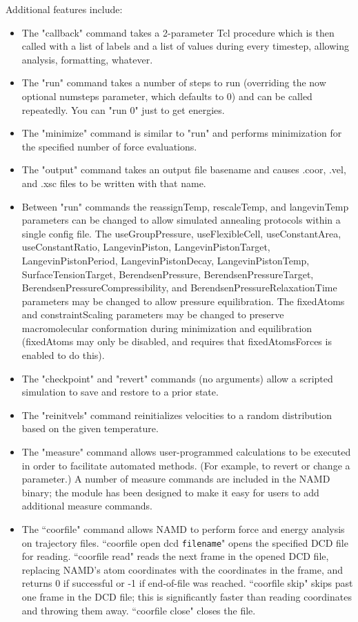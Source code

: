 Additional features include:
\begin{itemize}
 \item The "callback" command takes a 2-parameter Tcl procedure which
    is then called with a list of labels and a list of values during
    every timestep, allowing analysis, formatting, whatever.
 \item The "run" command takes a number of steps to run (overriding the
    now optional numsteps parameter, which defaults to 0) and can be
    called repeatedly.  You can "run 0" just to get energies.
 \item The "minimize" command is similar to "run" and performs
    minimization for the specified number of force evaluations.
 \item The "output" command takes an output file basename and causes
    .coor, .vel, and .xsc files to be written with that name.
 \item Between "run" commands the reassignTemp, rescaleTemp, and
    langevinTemp parameters can be changed to allow simulated
    annealing protocols within a single config file.
    The useGroupPressure, useFlexibleCell, useConstantArea, useConstantRatio,
    LangevinPiston, LangevinPistonTarget, LangevinPistonPeriod,
    LangevinPistonDecay, LangevinPistonTemp, SurfaceTensionTarget,
    BerendsenPressure, BerendsenPressureTarget,
    BerendsenPressureCompressibility, and BerendsenPressureRelaxationTime
    parameters may be changed to allow pressure equilibration.
    The fixedAtoms and constraintScaling parameters may be changed to
    preserve macromolecular conformation during minimization and
    equilibration (fixedAtoms may only be disabled, and requires that
    fixedAtomsForces is enabled to do this).
 \item The "checkpoint" and "revert" commands (no arguments) allow
    a scripted simulation to save and restore to a prior state.
 \item The "reinitvels" command reinitializes velocities to a
    random distribution based on the given temperature.
 \item The "measure" command allows user-programmed calculations to
    be executed in order to facilitate automated methods.  (For
    example, to revert or change a parameter.)  A number of measure
    commands are included in the NAMD binary; the module has been designed
    to make it easy for users to add additional measure commands.  
 \item The ``coorfile" command allows NAMD to perform force and energy
    analysis on trajectory files.  ``coorfile open dcd {\tt filename}" opens
    the specified DCD file for reading.  ``coorfile read" reads the next
    frame in the opened DCD file, replacing NAMD's atom coordinates with the
    coordinates in the frame, and returns 0 if successful or -1 if  
    end-of-file was reached.  ``coorfile skip" skips past one frame in the
    DCD file; this is significantly faster than reading coordinates and 
    throwing them away.  ``coorfile close" closes the file.   


\end{itemize}
